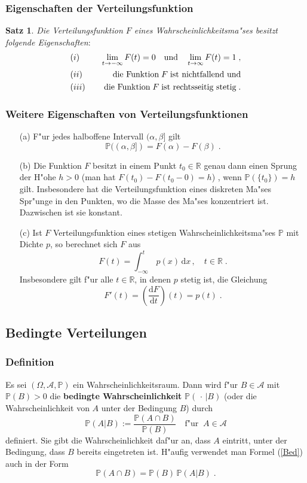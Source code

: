\documentclass[ngerman,draft,parskip=half,twoside]{scrartcl}
\newtheorem{thm}{Satz}[section]
\newcommand*{\R}{\mathbb{R}}      %
\newcommand*{\Algeb}{\mathcal{A}}   %
\newcommand*{\WKM}{\mathbb{P}}      %
\begin{document}
\subsubsection{Eigenschaften der Verteilungsfunktion}
\begin{thm}
\label{VF}
Die Verteilungsfunktion $F$ eines Wahrscheinlichkeitsma"ses besitzt folgende Eigenschaften$\colon$
\begin{eqnarray*}
&(i)&\quad\lim_{t\to -\infty} F(t)=0\quad\mbox{\rm und}\quad\lim_{t\to\infty} F(t)=1\;,\\
&(ii)&\quad\mbox{\rm die Funktion}\; F\;\mbox{\rm ist nichtfallend und}\\
&(iii)&\quad\mbox{\rm die Funktion}\;
F\;\mbox{\rm ist rechtsseitig stetig}\;.
\end{eqnarray*}
\end{thm}
\subsubsection{Weitere Eigenschaften von Verteilungsfunktionen}
\begin{enumerate}
\item[(a)]
F"ur jedes halboffene Intervall $(\alpha,\beta]$ gilt
$$
\WKM((\alpha,\beta])= F(\alpha)-F(\beta)\;.
$$
\item[(b)]
Die Funktion $F$ besitzt in einem Punkt $t_0\in\R$ genau dann einen Sprung der H"ohe
$h>0$ (man hat $F(t_0)-F(t_0-0)=h$) , wenn $\WKM(\{t_0\})=h$ gilt. Insbesondere hat die
Verteilungsfunktion eines diskreten Ma"ses Spr"unge in den Punkten, wo die Masse
des Ma"ses konzentriert ist. Dazwischen ist sie konstant.
\item[(c)]
Ist $F$ Verteilungsfunktion eines stetigen Wahrscheinlichkeitsma"ses $\WKM$ mit Dichte $p$, so berechnet
sich $F$ aus
$$
F(t)=\int_{-\infty}^t\,p(x)\,\mathrm d x\,,\quad t\in\R\;.
$$
Insbesondere gilt f"ur alle $t\in\R$, in denen $p$ stetig ist, die Gleichung
$$
F'(t)=\left(\frac{\mathrm d F}{\mathrm d t} \right)(t)= p(t)\;.
$$
\end{enumerate}
\subsection{Bedingte Verteilungen}
\subsubsection{Definition}
Es sei $(\Omega,\Algeb,\WKM)$ ein Wahrscheinlichkeitsraum. Dann wird
f"ur $B\in \Algeb$ mit $\WKM(B)>0$ die \textbf{bedingte Wahrscheinlichkeit} $\WKM(\,\cdot\,|B)$
(oder die Wahrscheinlichkeit von $A$ unter der Bedingung $B$)
durch
\begin{equation}
\label{Bed}
 \WKM(A|B):=\frac{\WKM(A\cap B)}{\WKM(B)}\quad\mbox{f"ur}\;\;A\in\Algeb
\end{equation}
definiert. Sie gibt die Wahrscheinlichkeit daf"ur an, dass $A$
eintritt, unter der Bedingung, dass $B$ bereits eingetreten ist. H"aufig verwendet man
Formel (\ref{Bed}) auch in der Form
$$
\WKM(A\cap B)= \WKM(B)\,\WKM(A|B)\;.
$$
\end{document}
